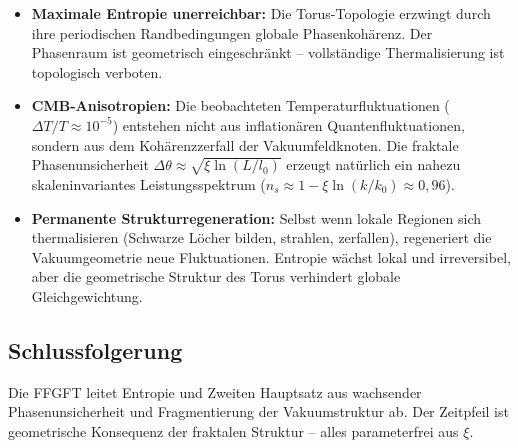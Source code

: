 	\begin{itemize}[leftmargin=*]
		\item \textbf{Maximale Entropie unerreichbar:} Die Torus-Topologie erzwingt durch ihre periodischen Randbedingungen globale Phasenkohärenz. Der Phasenraum ist geometrisch eingeschränkt -- vollständige Thermalisierung ist topologisch verboten.
		\item \textbf{CMB-Anisotropien:} Die beobachteten Temperaturfluktuationen ($\Delta T/T \approx 10^{-5}$) entstehen nicht aus inflationären Quantenfluktuationen, sondern aus dem Kohärenzzerfall der Vakuumfeldknoten. Die fraktale Phasenunsicherheit $\Delta \theta \approx \sqrt{\xi \ln(L/l_0)}$ erzeugt natürlich ein nahezu skaleninvariantes Leistungsspektrum ($n_s \approx 1 - \xi \ln(k/k_0) \approx 0{,}96$).
		\item \textbf{Permanente Strukturregeneration:} Selbst wenn lokale Regionen sich thermalisieren (Schwarze Löcher bilden, strahlen, zerfallen), regeneriert die Vakuumgeometrie neue Fluktuationen. Entropie wächst lokal und irreversibel, aber die geometrische Struktur des Torus verhindert globale Gleichgewichtung.
	\end{itemize}
	
	\subsection*{Schlussfolgerung}
	
	Die FFGFT leitet Entropie und Zweiten Hauptsatz aus wachsender Phasenunsicherheit und Fragmentierung der Vakuumstruktur ab. Der Zeitpfeil ist geometrische Konsequenz der fraktalen Struktur – alles parameterfrei aus \(\xi\).



